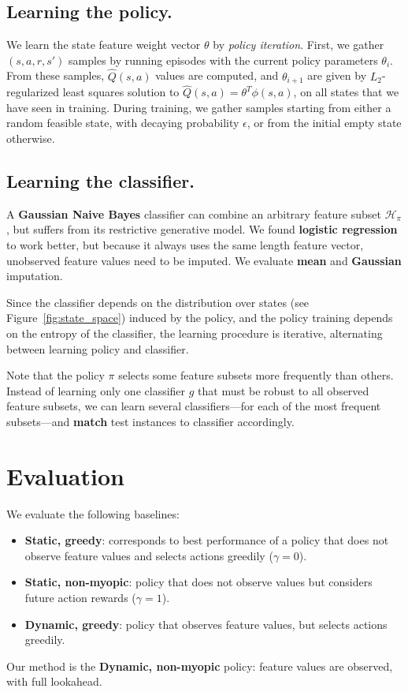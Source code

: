 \subsection{Learning the policy.}
We learn the state feature weight vector $\theta$ by \emph{policy iteration}.
First, we gather $(s, a, r, s')$ samples by running episodes with the current policy parameters $\theta_i$.
From these samples, $\hat{Q}(s, a)$ values are computed, and $\theta_{i+1}$ are given by $L_2$-regularized least squares solution to $\hat{Q}(s, a) = \theta^T \phi(s, a)$, on all states that we have seen in training.
During training, we gather samples starting from either a random feasible state, with decaying probability $\epsilon$, or from the initial empty state otherwise.

\subsection{Learning the classifier.}\label{sec:classifier}

A \textbf{Gaussian Naive Bayes} classifier can combine an arbitrary feature subset $\mathcal{H}_\pi$, but suffers from its restrictive generative model.
We found \textbf{logistic regression} to work better, but because it always uses the same length feature vector, unobserved feature values need to be imputed.
We evaluate \textbf{mean} and \textbf{Gaussian} imputation.

Since the classifier depends on the distribution over states (see Figure~\ref{fig:state_space}) induced by the policy, and the policy training depends on the entropy of the classifier, the learning procedure is iterative, alternating between learning policy and classifier.

Note that the policy $\pi$ selects some feature subsets more frequently than others.
Instead of learning only one classifier $g$ that must be robust to all observed feature subsets, we can learn several classifiers---for each of the most frequent subsets---and \textbf{match} test instances to classifier accordingly.

\section{Evaluation}
We evaluate the following baselines:
\vspace{-1em}
\begin{itemize}\addtolength{\itemsep}{-.55\baselineskip}
\item \textbf{Static, greedy}: corresponds to best performance of a policy that does not observe feature values and selects actions greedily ($\gamma=0$).
\item \textbf{Static, non-myopic}: policy that does not observe values but considers future action rewards ($\gamma=1$).
\item \textbf{Dynamic, greedy}: policy that observes feature values, but selects actions greedily.
\end{itemize}
\vspace{-1em}
Our method is the \textbf{Dynamic, non-myopic} policy: feature values are observed, with full lookahead.


